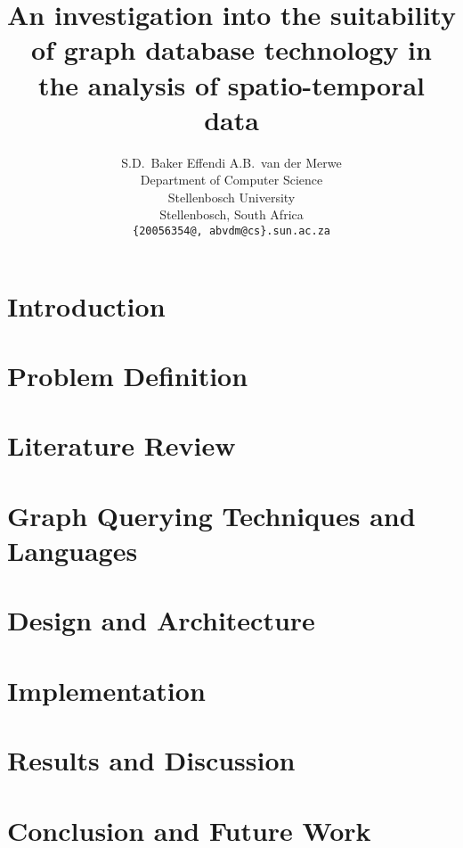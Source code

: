 \documentclass{article}
\title{An investigation into the suitability of graph database technology in the analysis of spatio-temporal data}
\author{
  S.D.~Baker Effendi \qquad  A.B.~van der Merwe \\
  Department of Computer Science\\
  Stellenbosch University\\
  Stellenbosch, South Africa \\
  \texttt{\{20056354@, abvdm@cs\}.sun.ac.za} \\
}
\begin{document}
\maketitle



\twocolumn

\section{Introduction}

\FloatBarrier

\section{Problem Definition}
\label{sec:prob-def}

\FloatBarrier

\section{Literature Review}
\label{sec:lit-rev}

\FloatBarrier

\section{Graph Querying Techniques and Languages}
\label{sec:graph-lang}

\FloatBarrier

\section{Design and Architecture}
\label{sec:des-arch}

\FloatBarrier

\section{Implementation}
\label{sec:impl}


\section{Results and Discussion}
\label{sec:experiments}


\section{Conclusion and Future Work}
\label{sec:conclusion}





\end{document}
